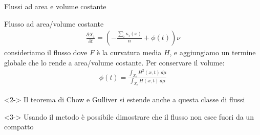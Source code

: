 \begin{frame}{Flussi ad area e volume costante}{}
	\begin{block}{Flusso ad area/volume costante}
		\begin{align*}
			\frac{\partial X_t}{\partial t} = \left(-\frac{\sum_i \kappa_i(x)}{n}+\phi(t)\right) \nu
		\end{align*}
		consideriamo il flusso dove $F$ è la curvatura media $H$, e aggiungiamo un termine globale che lo rende a area/volume costante. Per conservare il volume: 
		\begin{align*}
			\phi(t) = \frac{\int_{X_t} H^2(x, t) \, d\mu}{\int_{X_t} H(x, t) \, d\mu}
		\end{align*}
	\end{block}
	\begin{block}{}<2->
		Il teorema di Chow e Gulliver si estende anche a questa classe di flussi
	\end{block}
	\begin{block}{}<3->
		Usando il metodo è possibile dimostrare che il flusso non esce fuori da un compatto
	\end{block}
\end{frame}

